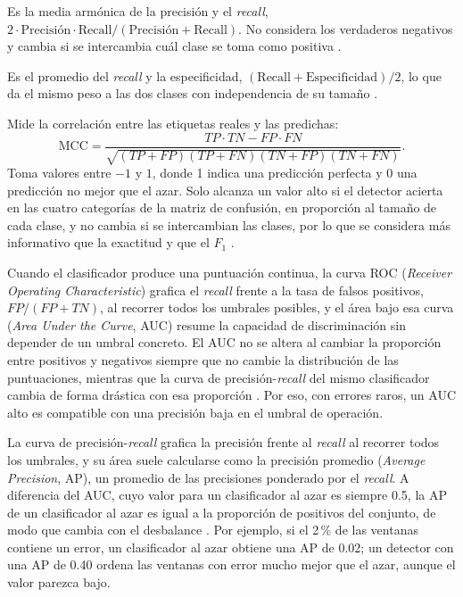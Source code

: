 Es la media armónica de la precisión y el \textit{recall}, $2 \cdot \mathrm{Precisión} \cdot \mathrm{Recall} / (\mathrm{Precisión} + \mathrm{Recall})$. No considera los verdaderos negativos y cambia si se intercambia cuál clase se toma como positiva \cite{chicco2020_mcc}.

Es el promedio del \textit{recall} y la especificidad, $(\mathrm{Recall} + \mathrm{Especificidad})/2$, lo que da el mismo peso a las dos clases con independencia de su tamaño \cite{diallo2025_metrics}.

Mide la correlación entre las etiquetas reales y las predichas:
\begin{equation}
\mathrm{MCC} = \frac{TP \cdot TN - FP \cdot FN}{\sqrt{(TP+FP)(TP+FN)(TN+FP)(TN+FN)}}.
\end{equation}
Toma valores entre $-1$ y $1$, donde 1 indica una predicción perfecta y 0 una predicción no mejor que el azar. Solo alcanza un valor alto si el detector acierta en las cuatro categorías de la matriz de confusión, en proporción al tamaño de cada clase, y no cambia si se intercambian las clases, por lo que se considera más informativo que la exactitud y que el $F_1$ \cite{chicco2020_mcc}.

Cuando el clasificador produce una puntuación continua, la curva ROC (\textit{Receiver Operating Characteristic}) grafica el \textit{recall} frente a la tasa de falsos positivos, $FP/(FP + TN)$, al recorrer todos los umbrales posibles, y el área bajo esa curva (\textit{Area Under the Curve}, AUC) resume la capacidad de discriminación sin depender de un umbral concreto. El AUC no se altera al cambiar la proporción entre positivos y negativos siempre que no cambie la distribución de las puntuaciones, mientras que la curva de precisión-\textit{recall} del mismo clasificador cambia de forma drástica con esa proporción \cite{richardson2024_roc}. Por eso, con errores raros, un AUC alto es compatible con una precisión baja en el umbral de operación.

La curva de precisión-\textit{recall} grafica la precisión frente al \textit{recall} al recorrer todos los umbrales, y su área suele calcularse como la precisión promedio (\textit{Average Precision}, AP), un promedio de las precisiones ponderado por el \textit{recall}. A diferencia del AUC, cuyo valor para un clasificador al azar es siempre 0.5, la AP de un clasificador al azar es igual a la proporción de positivos del conjunto, de modo que cambia con el desbalance \cite{richardson2024_roc}. Por ejemplo, si el 2\,\% de las ventanas contiene un error, un clasificador al azar obtiene una AP de 0.02; un detector con una AP de 0.40 ordena las ventanas con error mucho mejor que el azar, aunque el valor parezca bajo.


